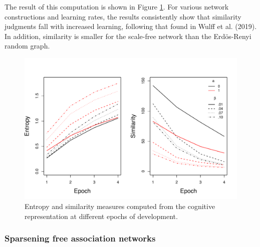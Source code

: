 \documentclass[
  man,floatsintext]{apa6}
\begin{document}
The result of this computation is shown in Figure \ref{fig:Figure4}. For various network constructions and learning rates, the results consistently show that similarity judgments fall with increased learning, following that found in Wulff et al. (2019). In addition, similarity is smaller for the scale-free network than the Erdös-Renyi random graph.

\begin{figure}

{\centering \includegraphics[width=1\linewidth]{EntropySim1000.01to.1} 

}

\caption{Entropy and similarity measures computed from the cognitive representation at different epochs of development.}\label{fig:Figure4}
\end{figure}

\hypertarget{sparsening-free-association-networks}{%
\subsubsection{Sparsening free association networks}\label{sparsening-free-association-networks}}
\end{document}
